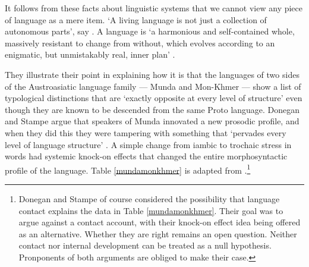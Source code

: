It follows from these facts about linguistic systems that we cannot 
view any piece of language as a mere item. \textquoteleft A living language is not 
just a collection of autonomous parts', say \citet[1]{donegan_rhythm_1983}. A language is \textquoteleft a harmonious and self-contained whole, massively 
resistant to change from without, which evolves according to an 
enigmatic, but unmistakably real, inner plan' \citep[1]{donegan_rhythm_1983}. 



They illustrate their point in explaining how it is that the languages 
of two sides of the Austroasiatic language family --- Munda and 
Mon-Khmer --- show a list of typological distinctions that are \textquoteleft exactly 
opposite at every level of structure' \citep[111]{donegan_south-east_2002} 
even though they are known to be descended from the same Proto language. Donegan and Stampe argue that speakers of Munda innovated a new prosodic profile, and when they did this they 
were tampering with something that \textquoteleft pervades every level of language 
structure' \citep[14]{donegan_rhythm_1983}. A simple change from iambic to trochaic stress in words had systemic knock-on effects that changed the entire morphosyntactic profile of the language. Table \ref{mundamonkhmer}
is adapted from \citet[1--2]{donegan_rhythm_1983}.\footnote{Donegan and Stampe of course considered the possibility that language contact explains the data in Table \ref{mundamonkhmer}. Their goal was to argue against a contact account, with their knock-on effect idea being offered as an alternative. Whether they are right remains an open question. Neither contact nor internal development can be treated as a null hypothesis. Pronponents of both arguments are obliged to make their case.}


